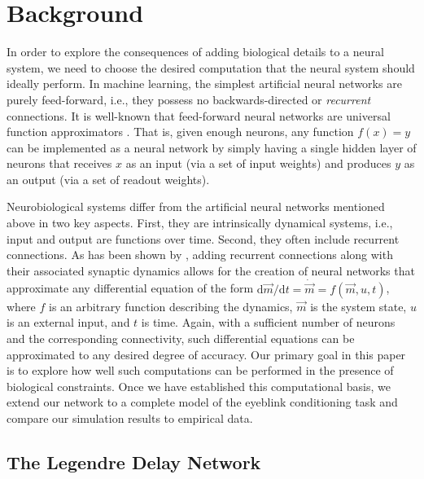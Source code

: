 
\section{Background}

In order to explore the consequences of adding biological details to a neural system, we need to choose the desired computation that the neural system should ideally perform.
In machine learning, the simplest artificial neural networks are purely feed-forward, i.e., they possess no backwards-directed or \emph{recurrent} connections. It is well-known that feed-forward neural networks are universal function approximators \citep{hornik1989multilayer}.
That is, given enough neurons, any function $f(x) = y$ can be implemented as a neural network by simply having a single hidden layer of neurons that receives $x$ as an input (via a set of input weights) and produces $y$ as an output (via a set of readout weights).

Neurobiological systems differ from the artificial neural networks mentioned above in two key aspects.
First, they are intrinsically dynamical systems, i.e., input and output are functions over time.
Second, they often include recurrent connections.
As has been shown by \citet{eliasmith2003neural}, adding recurrent connections along with their associated synaptic dynamics allows for the creation of neural networks that approximate any differential equation of the form ${\mathrm{d}\vec m}/{\mathrm{d}t} = {\dot{\vec m}} = f(\vec m, u, t)$, where $f$ is an arbitrary function describing the dynamics, $\vec m$ is the system state, $u$ is an external input, and $t$ is time.
Again, with a sufficient number of neurons and the corresponding connectivity, such differential equations can be approximated to any desired degree of accuracy.
Our primary goal in this paper is to explore how well such computations can be performed in the presence of biological constraints. Once we have established this computational basis, we extend our network to a complete model of the eyeblink conditioning task and compare our simulation results to empirical data.

\subsection{The Legendre Delay Network}

